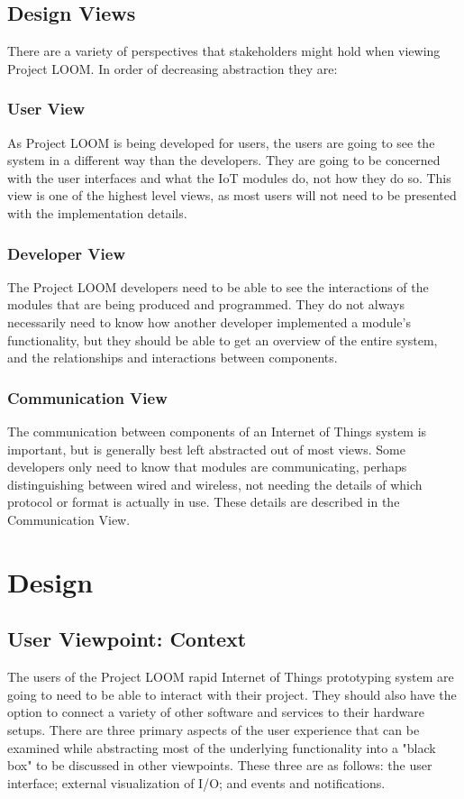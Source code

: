 \documentclass[onecolumn, draftclsnofoot,10pt, compsoc]{IEEEtran}
\begin{document}
\subsection{Design Views}
    There are a variety of perspectives that stakeholders might hold when viewing Project LOOM. In order of decreasing abstraction they are:

\subsubsection{User View}
    As Project LOOM is being developed for users, the users are going to see the system in a different way than the developers. They are going to be concerned with the user interfaces and what the IoT modules do, not how they do so. This view is one of the highest level views, as most users will not need to be presented with the implementation details.

\subsubsection{Developer View}
    The Project LOOM developers need to be able to see the interactions of the modules that are being produced and programmed. They do not always necessarily need to know how another developer implemented a module's functionality, but they should be able to get an overview of the entire system, and the relationships and interactions between components.

\subsubsection{Communication View}
    The communication between components of an Internet of Things system is important, but is generally best left abstracted out of most views. Some developers only need to know that modules are communicating, perhaps distinguishing between wired and wireless, not needing the details of which protocol or format is actually in use. These details are described in the Communication View.





\section{Design}
\subsection{User Viewpoint: Context}
    The users of the Project LOOM rapid Internet of Things prototyping system are going to need to be able to interact with their project. They should also have the option to connect a variety of other software and services to their hardware setups. There are three primary aspects of the user experience that can be examined while abstracting most of the underlying functionality into a "black box" to be discussed in other viewpoints. These three are as follows: the user interface; external visualization of I/O; and events and notifications.
\end{document}

